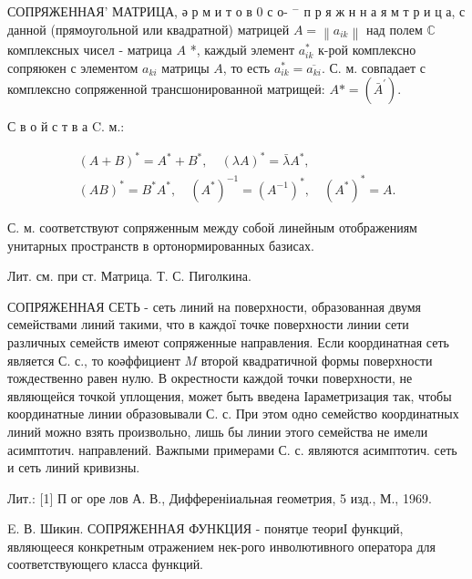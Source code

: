 \documentclass[10pt]{article}
\begin{document}
СОПРЯЖЕННАЯ' МАТРИЦА, ә р м и т о в 0 с о- $^{-}$ п р я ж н н а я м т р и ц а, с данной (прямоугольной или квадратной) матрицей $A=\left\|a_{i k}\right\|$ над полем $\mathbb{C}$ комплексных чисел - матрица $A$ *, каждый элемент $a_{i k}^{*}$ к-рой комплексно сопряюкен с элементом $a_{k i}$ матрицы $A$, то есть $a_{i k}^{*}=\overline{a_{k i}}$. С. м. совпадает с комплексно сопряженной трансшонированноӥ матрищеӥ: $A *=\left(\bar{A}^{\prime}\right)$.



С в о й с т в а C. м.:



\[

\begin{gathered}

(A+B)^{*}=A^{*}+B^{*}, \quad(\lambda A)^{*}=\bar{\lambda} A^{*}, \\

(A B)^{*}=B^{*} A^{*}, \quad\left(A^{*}\right)^{-1}=\left(A^{-1}\right)^{*}, \quad\left(A^{*}\right)^{*}=A .

\end{gathered}

\]



С. м. соответствуют сопряженным между собой линейным отображениям унитарных пространств в ортонормированных базисах.



Лит. см. при ст. Матрица. Т. С. Пиголкина.



СОПРЯЖЕННАЯ СЕТЬ - сеть линий на поверхности, образованная двумя семействами линий такими, что в каждої точке поверхности линии сети различных семейств имеют сопряженные направления. Если координатная сеть является С. с., то коәффициент $M$ второй квадратичной формы поверхности тождественно равен нулю. В окрестности каждой точки поверхности, не являющеӥся точкой уплощения, может быть введена Іараметризация так, чтобы координатные линии образовывали С. с. При этом одно семейство координатных линий можно взять произвольно, лишь бы линии этого семейства не имели асимптотич. направлений. Важпыми примерами С. с. являются асимптотич. сеть и сеть линий кривизны.



Лит.: [1] П ог оре лов А. В., Дифференіиальная геометрия, 5 изд., М., 1969.



E. В. Шикин. СОПРЯЖЕННАЯ ФУНКЦИЯ - понятџе теориІ функций, являющееся конкретным отражением нек-рого инволютивного оператора для соответствующего класса функций.
\end{document}
